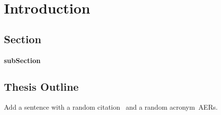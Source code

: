 \chapter{Introduction}
\label{chapter:introduction}
\section{Section}
\subsubsection{subSection}
\section{Thesis Outline} %

Add a sentence with a random citation~\citep{Camunas-Mesa_etal08} and a random acronym~\acp{AER}.